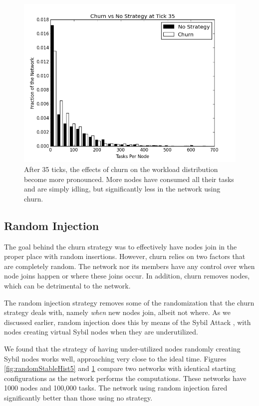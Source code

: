 \documentclass[11pt,conference]{IEEEtran}
\begin{document}
{	\begin{figure}
		\centering
		\includegraphics[width=0.7\linewidth]{figs/ChurnStableHist35}
		\caption[Workload for churn at tick 35]{After 35 ticks, the effects of churn on the workload distribution become more pronounced.  More nodes have consumed all their tasks and are simply idling, but significantly less in the network using churn.}
		\label{fig:churnStableHist35}
	\end{figure}
	
	\subsection{Random Injection}
	
	The goal behind the churn strategy was to effectively have nodes join in the proper place with random insertions.
	However, churn relies on two factors that are completely random.
	The network nor its members have any control over when node joins happen or where these joins occur.
	In addition, churn removes nodes, which can be detrimental to the network.
	
	The random injection strategy removes some of the randomization that the churn strategy deals with, namely \textit{when} new nodes join, albeit not where.
	As we discussed earlier, random injection does this by means of the Sybil Attack \cite{sybil}, with nodes creating virtual Sybil nodes when they are underutilized.
	
	We found that the strategy of having under-utilized nodes randomly creating Sybil nodes works well, approaching very close to the ideal time.
	Figures \ref{fig:randomStableHist5} and \ref{fig:churnStableHist35} compare two networks with identical starting configurations as the network performs the computations.
	These networks have 1000 nodes and 100,000 tasks.  
	The network using random injection fared significantly better than those using no strategy.
	
}
\end{document}
